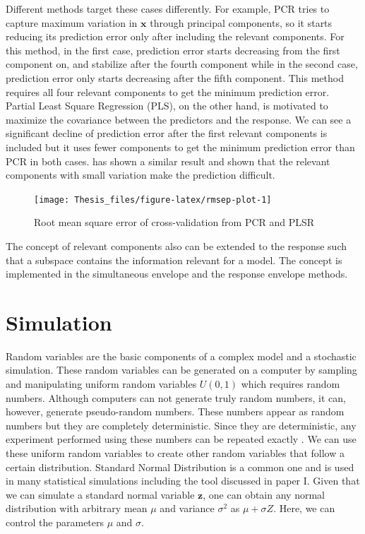 \documentclass[11pt,twoside,openright,titlepage,
  headinclude,footinclude,BCOR=5mm,
  numbers=noenddot,cleardoublepage=empty,
  tablecaptionabove, dottedtoc,
  bibliography=totoc,paper=a4]{scrreprt}
\begin{document}
Different methods target these cases differently. For example, PCR tries to capture maximum variation in \(\mathbf{x}\) through principal components, so it starts reducing its prediction error only after including the relevant components. For this method, in the first case, prediction error starts decreasing from the first component on, and stabilize after the fourth component while in the second case, prediction error only starts decreasing after the fifth component. This method requires all four relevant components to get the minimum prediction error. Partial Least Square Regression (PLS), on the other hand, is motivated to maximize the covariance between the predictors and the response. We can see a significant decline of prediction error after the first relevant components is included but it uses fewer components to get the minimum prediction error than PCR in both cases. \citet{Helland1994b} has shown a similar result and shown that the relevant components with small variation make the prediction difficult.

\begin{figure}[!htb]
\texttt{[image: Thesis\_files/figure-latex/rmsep-plot-1]} \caption[]{Root mean square error of cross-validation from PCR and PLSR}\label{fig:rmsep-plot}
\end{figure}

The concept of relevant components also can be extended to the response such that a subspace contains the information relevant for a model. The concept is implemented in the simultaneous envelope \citep{cook2015simultaneous} and the response envelope \citep{cook2010envelope} methods.

\hypertarget{simulation}{%
\section{Simulation}\label{simulation}}

Random variables are the basic components of a complex model and a stochastic simulation. These random variables can be generated on a computer by sampling and manipulating uniform random variables \(U(0, 1)\) which requires random numbers. Although computers can not generate truly random numbers, it can, however, generate pseudo-random numbers. These numbers appear as random numbers but they are completely deterministic. Since they are deterministic, any experiment performed using these numbers can be repeated exactly \citep{jones2014introduction}. We can use these uniform random variables to create other random variables that follow a certain distribution. Standard Normal Distribution is a common one and is used in many statistical simulations including the tool discussed in paper I. Given that we can simulate a standard normal variable \(\mathbf{z}\), one can obtain any normal distribution with arbitrary mean \(\mu\) and variance \(\sigma^2\) as \(\mu + \sigma Z\). Here, we can control the parameters \(\mu\) and \(\sigma\).
\end{document}
